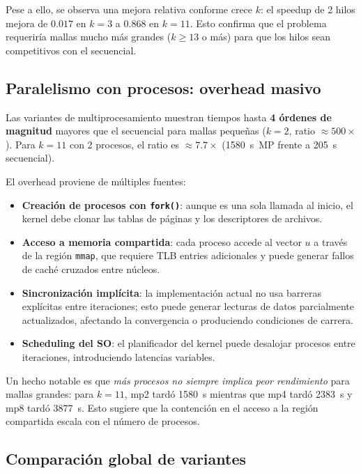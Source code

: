 \documentclass{article}
\begin{document}
Pese a ello, se observa una mejora relativa conforme crece $k$: el speedup de 2
hilos mejora de $0.017$ en $k=3$ a $0.868$ en $k=11$.  Esto confirma que el
problema requeriría mallas mucho más grandes ($k \geq 13$ o más) para que los
hilos sean competitivos con el secuencial.

\subsection{Paralelismo con procesos: overhead masivo}

Las variantes de multiprocesamiento muestran tiempos hasta \textbf{4 órdenes de
magnitud} mayores que el secuencial para mallas pequeñas ($k=2$, ratio $\approx
500\times$).  Para $k=11$ con 2 procesos, el ratio es $\approx 7.7\times$
(1580~s~MP frente a 205~s secuencial).

El overhead proviene de múltiples fuentes:
\begin{itemize}
  \item \textbf{Creación de procesos con \texttt{fork()}}: aunque es una sola
    llamada al inicio, el kernel debe clonar las tablas de páginas y los
    descriptores de archivos.
  \item \textbf{Acceso a memoria compartida}: cada proceso accede al vector $u$
    a través de la región \texttt{mmap}, que requiere TLB entries adicionales y
    puede generar fallos de caché cruzados entre núcleos.
  \item \textbf{Sincronización implícita}: la implementación actual no usa
    barreras explícitas entre iteraciones; esto puede generar lecturas de datos
    parcialmente actualizados, afectando la convergencia o produciendo condiciones
    de carrera.
  \item \textbf{Scheduling del SO}: el planificador del kernel puede desalojar
    procesos entre iteraciones, introduciendo latencias variables.
\end{itemize}

Un hecho notable es que \emph{más procesos no siempre implica peor rendimiento}
para mallas grandes: para $k=11$, mp2 tardó 1580~s mientras que mp4 tardó
2383~s y mp8 tardó 3877~s.  Esto sugiere que la contención en el acceso a la
región compartida escala con el número de procesos.

\subsection{Comparación global de variantes}
\end{document}

